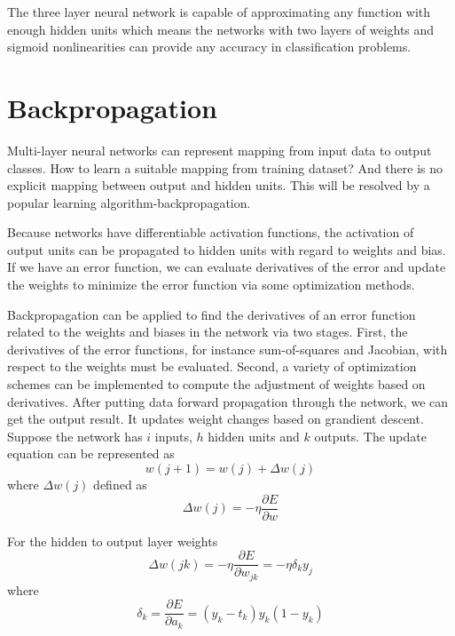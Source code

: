 The three layer neural network is capable of approximating any function with enough hidden units which means the networks with two layers of weights and sigmoid nonlinearities can provide any accuracy in classification problems. 


\section{Backpropagation}

Multi-layer neural networks can represent mapping from input data to output classes. How to learn a suitable mapping from training dataset? And there is no explicit mapping between output and hidden units. This will be resolved by a popular learning algorithm-backpropagation.

Because networks have differentiable activation functions, the activation of output units can be propagated to hidden units with regard to weights and bias. If we have an error function, we can evaluate derivatives of the error and update the weights to minimize the error function via some optimization methods.

Backpropagation can be applied to find the derivatives of an error function related to the weights and biases in the network via two stages. First, the derivatives of the error functions, for instance sum-of-squares and Jacobian, with respect to the weights must be evaluated. Second, a variety of optimization schemes can be implemented to compute the adjustment of weights based on derivatives. After putting data forward propagation through the network, we can get the output result. It updates weight changes based on grandient descent. Suppose the network has $i$ inputs, $h$ hidden units and $k$ outputs. The update equation can be represented as 
\begin{equation}\label{eq:UpdateWeights}
w(j+1) = w(j) + \Delta w(j)
\end{equation}
where $\Delta w(j)$ defined as 
\begin{equation}\label{eq:DeltaWeights}
\Delta w(j) = -\eta \frac{\partial E}{\partial w}
\end{equation}

For the hidden to output layer weights
\begin{equation}\label{eq:h2oBP}
\Delta w(jk) = -\eta \frac{\partial E}{\partial w_{jk}} = -\eta \delta_{k}y_{j}
\end{equation}
where $$\delta_{k} = \frac{\partial E}{\partial a_{k}} = (y_{k} - t_{k})y_{k}(1 - y_{k})$$


